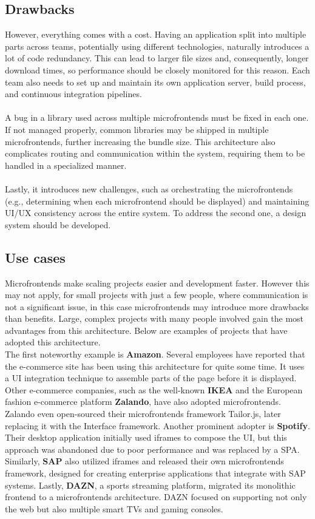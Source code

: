 \subsection{Drawbacks}
However, everything comes with a cost. Having an application split into multiple parts across teams, potentially using different technologies, naturally introduces a lot of code redundancy. This can lead to larger file sizes and, consequently, longer download times, so performance should be closely monitored for this reason. Each team also needs to set up and maintain its own application server, build process, and continuous integration pipelines. \\\\
\noindent
A bug in a library used across multiple microfrontends must be fixed in each one. If not managed properly, common libraries may be shipped in multiple microfrontends, further increasing the bundle size. This architecture also complicates routing and communication within the system, requiring them to be handled in a specialized manner. \\\\
\noindent
Lastly, it introduces new challenges, such as orchestrating the microfrontends (e.g., determining when each microfrontend should be displayed) and maintaining UI/UX consistency across the entire system. To address the second one, a design system should be developed.\cite{Geers}\cite{Pavlenko}

\subsection{Use cases}
Microfrontends make scaling projects easier and development faster. However this may not apply, for small projects with just a few people, where communication is not a significant issue, in this case microfrontends may introduce more drawbacks than benefits. Large, complex projects with many people involved gain the most advantages from this architecture. Below are examples of projects that have adopted this architecture.  \\

\noindent
The first noteworthy example is \textbf{Amazon}. Several employees have reported that the e-commerce site has been using this architecture for quite some time. It uses a UI integration technique to assemble parts of the page before it is displayed. Other e-commerce companies, such as the well-known \textbf{IKEA} and the European fashion e-commerce platform \textbf{Zalando}, have also adopted microfrontends. Zalando even open-sourced their microfrontends framework Tailor.js, later replacing it with the Interface framework. Another prominent adopter is \textbf{Spotify}. Their desktop application initially used iframes to compose the UI, but this approach was abandoned due to poor performance and was replaced by a SPA. Similarly, \textbf{SAP} also utilized iframes and released their own microfrontends framework, designed for creating enterprise applications that integrate with SAP systems. Lastly, \textbf{DAZN}, a sports streaming platform, migrated its monolithic frontend to a microfrontends architecture. DAZN focused on supporting not only the web but also multiple smart TVs and gaming consoles.\cite{Geers} \cite{Mezzalira}

